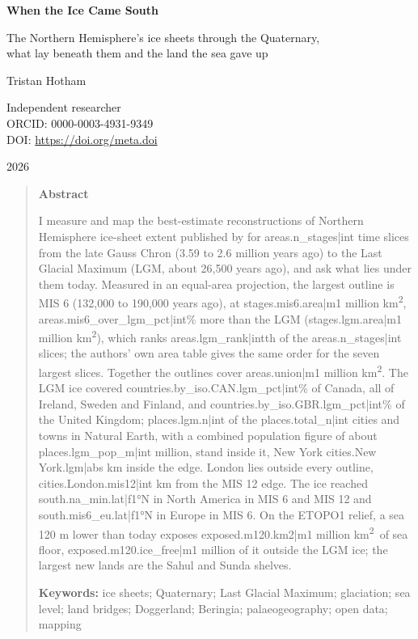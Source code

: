 \documentclass[11pt,a4paper]{article}
\newcommand{\kmq}{km\textsuperscript{2}}
\begin{document}
\begin{center}
{\Large\bfseries When the Ice Came South\par}
\vspace{0.4em}
{\large The Northern Hemisphere's ice sheets through the Quaternary,\\what lay beneath them and the land the sea gave up\par}
\vspace{1.2em}
{\large Tristan Hotham\par}
\vspace{0.3em}
{\small Independent researcher\\
ORCID: 0000-0003-4931-9349\\
DOI: \href{https://doi.org/{{meta.doi}}}{https://doi.org/{{meta.doi}}}\par}
\vspace{0.8em}
2026
\end{center}

\begin{quote}
\small
\begin{center}\textbf{Abstract}\end{center}
I measure and map the best-estimate reconstructions of Northern Hemisphere ice-sheet extent published by \citet{batchelor} for {{areas.n_stages|int}} time slices from the late Gauss Chron (3.59 to 2.6 million years ago) to the Last Glacial Maximum (LGM, about 26,500 years ago), and ask what lies under them today. Measured in an equal-area projection, the largest outline is MIS 6 (132,000 to 190,000 years ago), at {{stages.mis6.area|m1}} million \kmq, {{areas.mis6_over_lgm_pct|int}}\% more than the LGM ({{stages.lgm.area|m1}} million \kmq), which ranks {{areas.lgm_rank|int}}th of the {{areas.n_stages|int}} slices; the authors' own area table gives the same order for the seven largest slices. Together the outlines cover {{areas.union|m1}} million \kmq. The LGM ice covered {{countries.by_iso.CAN.lgm_pct|int}}\% of Canada, all of Ireland, Sweden and Finland, and {{countries.by_iso.GBR.lgm_pct|int}}\% of the United Kingdom; {{places.lgm.n|int}} of the {{places.total_n|int}} cities and towns in Natural Earth, with a combined population figure of about {{places.lgm_pop_m|int}} million, stand inside it, New York {{cities.New York.lgm|abs}} km inside the edge. London lies outside every outline, {{cities.London.mis12|int}} km from the MIS 12 edge. The ice reached {{south.na_min.lat|f1}}°N in North America in MIS 6 and MIS 12 and {{south.mis6_eu.lat|f1}}°N in Europe in MIS 6. On the ETOPO1 relief, a sea 120 m lower than today exposes {{exposed.m120.km2|m1}} million \kmq\ of sea floor, {{exposed.m120.ice_free|m1}} million of it outside the LGM ice; the largest new lands are the Sahul and Sunda shelves.

\textbf{Keywords:} ice sheets; Quaternary; Last Glacial Maximum; glaciation; sea level; land bridges; Doggerland; Beringia; palaeogeography; open data; mapping
\end{quote}
\end{document}
